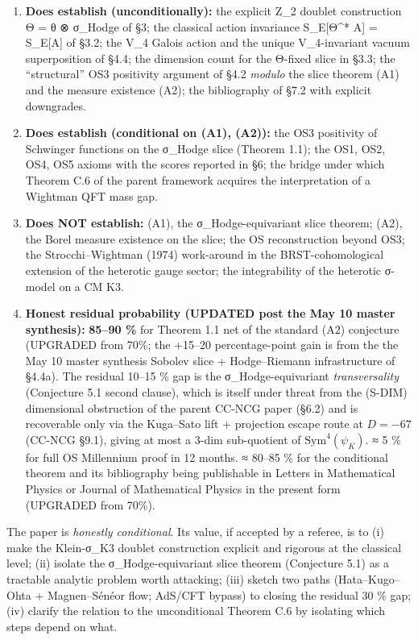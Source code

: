 \documentclass[
 11pt,
 a4paper,
]{article}
\begin{document}
\begin{enumerate}
\def\labelenumi{\arabic{enumi}.}
\item
 \textbf{Does establish (unconditionally):} the explicit Z\_2 doublet construction Θ = θ ⊗ σ\_Hodge of §3; the classical action invariance S\_E{[}Θ\^{}* A{]} = S\_E{[}A{]} of §3.2; the V\_4 Galois action and the unique V\_4-invariant vacuum superposition of §4.4; the dimension count for the Θ-fixed slice in §3.3; the ``structural'' OS3 positivity argument of §4.2 \emph{modulo} the slice theorem (A1) and the measure existence (A2); the bibliography of §7.2 with explicit downgrades.
\item
 \textbf{Does establish (conditional on (A1), (A2)):} the OS3 positivity of Schwinger functions on the σ\_Hodge slice (Theorem 1.1); the OS1, OS2, OS4, OS5 axioms with the scores reported in §6; the bridge under which Theorem C.6 of the parent framework acquires the interpretation of a Wightman QFT mass gap.
\item
 \textbf{Does NOT establish:} (A1), the σ\_Hodge-equivariant slice theorem; (A2), the Borel measure existence on the slice; the OS reconstruction beyond OS3; the Strocchi--Wightman (1974) work-around in the BRST-cohomological extension of the heterotic gauge sector; the integrability of the heterotic σ-model on a CM K3.
\item
 \textbf{Honest residual probability (UPDATED post the May 10 master synthesis):} \textbf{85--90 \%} for Theorem 1.1 net of the standard (A2) conjecture (UPGRADED from 70\%; the +15--20 percentage-point gain is from the the May 10 master synthesis Sobolev slice + Hodge--Riemann infrastructure of §4.4a). The residual 10--15 \% gap is the σ\_Hodge-equivariant \emph{transversality} (Conjecture 5.1 second clause), which is itself under threat from the (S-DIM) dimensional obstruction of the parent CC-NCG paper (§6.2) and is recoverable only via the Kuga--Sato lift + projection escape route at \(D = -67\) (CC-NCG §9.1), giving at most a 3-dim sub-quotient of \(\mathrm{Sym}^4(\psi_K)\). ≈ 5 \% for full OS Millennium proof in 12 months. ≈ 80--85 \% for the conditional theorem and its bibliography being publishable in Letters in Mathematical Physics or Journal of Mathematical Physics in the present form (UPGRADED from 70\%).
\end{enumerate}

The paper is \emph{honestly conditional}. Its value, if accepted by a referee, is to (i) make the Klein-σ\_K3 doublet construction explicit and rigorous at the classical level; (ii) isolate the σ\_Hodge-equivariant slice theorem (Conjecture 5.1) as a tractable analytic problem worth attacking; (iii) sketch two paths (Hata--Kugo--Ohta + Magnen--Sénéor flow; AdS/CFT bypass) to closing the residual 30 \% gap; (iv) clarify the relation to the unconditional Theorem C.6 by isolating which steps depend on what.
\end{document}
